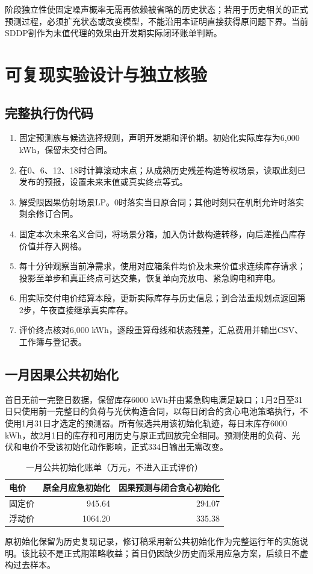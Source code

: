 阶段独立性使固定噪声概率无需再依赖被省略的历史状态；若用于历史相关的正式预测过程，必须扩充状态或改变模型，不能沿用本证明直接获得原问题下界。当前SDDP割作为末值代理的效果由开发期实际闭环账单判断。

\section{可复现实验设计与独立核验}
\subsection{完整执行伪代码}
\begin{enumerate}
\item 固定预测族与候选选择规则，声明开发期和评价期。初始化实际库存为6,000 kWh，保留未交付合同。
\item 在0、6、12、18时计算滚动末点；从成熟历史残差构造等权场景，读取此刻已发布的预报，设置未来末值或真实终点等式。
\item 解受限因果仿射场景LP。0时落实当日原合同；其他时刻只在机制允许时落实剩余修订合同。
\item 固定本次未来名义合同，将场景分箱，加入伪计数构造转移，向后递推凸库存价值并存入网格。
\item 每十分钟观察当前净需求，使用对应箱条件均价及未来价值求连续库存请求；投影至单步和真正终点可达交集，恢复单向充放电、紧急购电和弃电。
\item 用实际交付电价结算本段，更新实际库存与历史信息；到合法重规划点返回第2步，午夜直接继承真实库存。
\item 评价终点核对6,000 kWh，逐段重算母线和状态残差，汇总费用并输出CSV、工作簿与登记表。
\end{enumerate}

\subsection{一月因果公共初始化}
首日无前一完整日数据，保留库存6000 kWh并由紧急购电满足缺口；1月2日至31日只使用前一完整日的负荷与光伏构造合同，以每日闭合的贪心电池策略执行，不使用1月31日才选定的预测器。所有候选共用该初始化轨迹，每日末库存6000 kWh，故2月1日的库存和可用历史与原正式回放完全相同。预测使用的负荷、光伏和电价不受该初始化动作影响，正式334日输出无需改变。
\begin{table}[H]\centering\small\caption{一月公共初始化账单（万元，不进入正式评价）}
\begin{tabular}{lrr}\toprule
电价&原全月应急初始化&因果预测与闭合贪心初始化\\\midrule
固定价&945.64&294.07\\
浮动价&1064.20&335.38\\\bottomrule\end{tabular}\end{table}
原初始化保留为历史复现记录，修订稿采用新公共初始化作为完整运行年的实施说明。该比较不是正式期策略收益；首日仍因缺少历史而采用应急方案，后续日不虚构过去样本。

